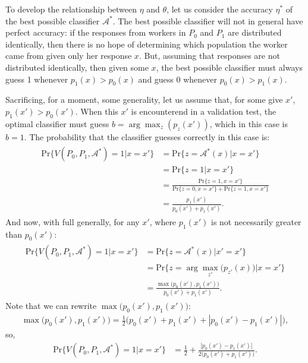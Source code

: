 \documentclass{sigchi}
\begin{document}
To develop the relationship between $\eta$ and $\theta$, let us consider
the accuracy $\eta^*$ of the best possible classifier $\mathcal{A}^*$.
The best possible classifier will not in general have perfect accuracy:
if the responses from workers in $P_0$ and $P_1$ are distributed 
identically, then there is no hope of determining which population the worker 
came from given only her response $x$.  But, assuming that responses are
not distributed identically, then given some $x$, the best possible 
classifier must always guess 1 whenever $p_1(x) > p_0(x)$ and guess 0 whenever
$p_0(x) > p_1(x)$.

Sacrificing, for a moment, some generality, let us assume that, for some give 
$x'$, $p_1(x') > p_0(x')$.  
When this $x'$ is encounterend in a validation test, the optimal classifier
must guess $b = \arg\!\max_{z}(p_{z}(x'))$, which in this case is $b=1$.
The probability that the classifier guesses correctly in this case is:
\begin{align}
	\begin{split}
	\mathrm{Pr}\{V(P_0, P_1, \mathcal{A}^*) = 1 | x = x' \} 
		&= \mathrm{Pr}\{z = \mathcal{A^*}(x) | x = x' \} \\
		&= \mathrm{Pr}\{z = 1 | x = x' \}  \\
		&= \frac{\mathrm{Pr}\{z = 1 , x = x'\}}
			{ \mathrm{Pr}\{z=0 , x=x'\} + \mathrm{Pr}\{z=1 , x=x'\}} \\
		&= \frac{p_1(x')}{p_0(x') + p_1(x')}.
	\end{split}
\end{align}
And now, with full generally, for any $x'$, where $p_1(x')$ is not necessarily
greater than $p_0(x')$:
\begin{align}
	\begin{split}
		\mathrm{Pr}\{V(P_0,P_1,\mathcal{A}^*)=1 | x = x' \} 
		&= \mathrm{Pr}\{z=\mathcal{A^*}(x)  | x' = x' \} \\
		&= \mathrm{Pr}\{z = \arg\!\max_{z'}\big(p_{z'}(x)\big)| x = x' \}  \\
		&= \frac{\max\big( p_0(x'),p_1(x') \big)}
		{ p_0(x') + p_1(x') }.
	\end{split}
\end{align}
Note that we can rewrite $\max\big(p_0(x'),p_1(x')\big)$:
\begin{align}
	\max\big(p_0(x'),p_1(x')\big) = \frac{1}{2}
		\big(
			p_0(x') + p_1(x') + |p_0(x') - p_1(x')|
		\big),
\end{align}
so,
\begin{align}
	\mathrm{Pr}\{V(P_0,P_1,\mathcal{A}^*) = 1 | x = x' \} 
	&= \frac{1}{2} + \frac{|p_0(x') - p_1(x')|}{2 \big(p_0(x') + p_1(x') \big)}.
\end{align}
\end{document}
